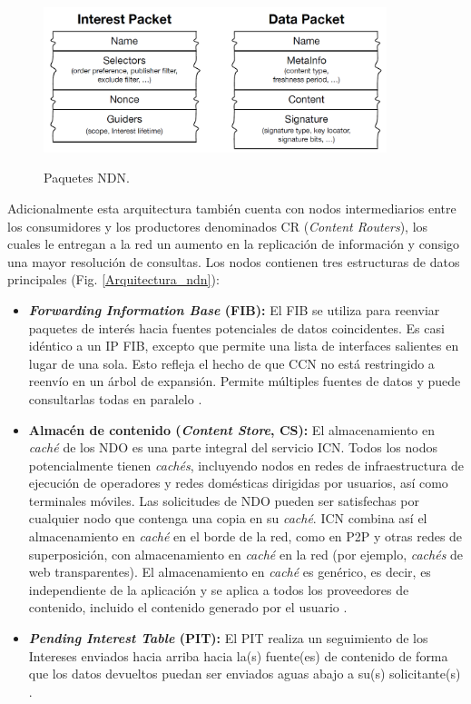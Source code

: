 \documentclass[12pt]{ociamthesis}  %
\begin{document}
\begin{figure}[!htb]
		\centering
		\includegraphics[width=10cm]{Paquetes_NDN.png}\\
		\caption{Paquetes NDN.}
		\label{Paquetes_NDN}
\end{figure}
 
Adicionalmente esta arquitectura también cuenta con nodos intermediarios entre los consumidores y los productores denominados CR (\textit{Content Routers}), los cuales le entregan a la red un aumento en la replicación de información y consigo una mayor resolución de consultas. Los nodos contienen tres estructuras de datos principales (Fig. \ref{Arquitectura_ndn}):

\begin{itemize}
	\item\textbf{\textit{Forwarding Information Base} (FIB):} El FIB se utiliza para reenviar paquetes de interés hacia fuentes potenciales de datos coincidentes. Es casi idéntico a un IP FIB, excepto que permite una lista de interfaces salientes en lugar de una sola. Esto refleja el hecho de que CCN no está restringido a reenvío en un árbol de expansión. Permite múltiples fuentes de datos y puede consultarlas todas en paralelo \cite{jacobson2009networking}.\\
	\item \textbf{Almacén de contenido (\textit{Content Store}, CS):} El almacenamiento en \textit{caché} de los NDO es una parte integral del servicio ICN. Todos los nodos potencialmente tienen \textit{cachés}, incluyendo nodos en redes de infraestructura de ejecución de operadores y redes domésticas dirigidas por usuarios, así como terminales móviles. Las solicitudes de NDO pueden ser satisfechas por cualquier nodo que contenga una copia en su \textit{caché}. ICN combina así el almacenamiento en \textit{caché} en el borde de la red, como en P2P y otras redes de superposición, con almacenamiento en \textit{caché} en la red (por ejemplo, \textit{cachés} de web transparentes). El almacenamiento en \textit{caché} es genérico, es decir, es independiente de la aplicación y se aplica a todos los proveedores de contenido, incluido el contenido generado por el usuario \cite{jacobson2009networking}.\\
	\item \textbf{\textit{Pending Interest Table} (PIT):} El PIT realiza un seguimiento de los Intereses enviados hacia arriba hacia la(s) fuente(es) de contenido de forma que los datos devueltos puedan ser enviados aguas abajo a su(s) solicitante(s) \cite{jacobson2009networking}.\\
\end{itemize}
\end{document}
